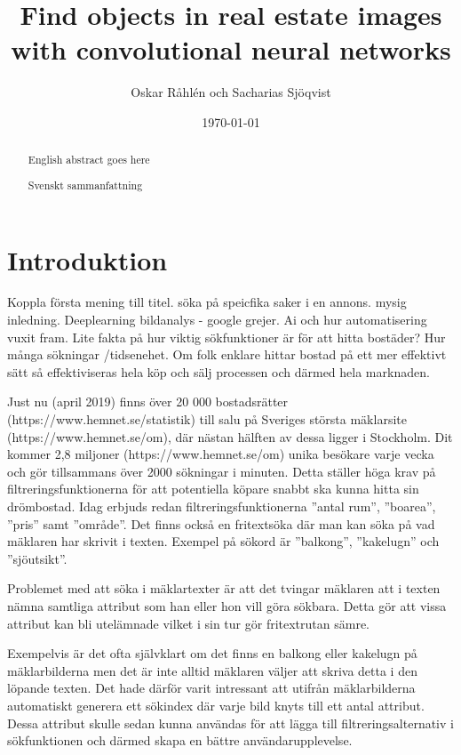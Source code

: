\documentclass[]{kththesis}
\title{Find objects in real estate images with convolutional neural networks}
\author{Oskar Råhlén och Sacharias Sjöqvist}
\date{\today}
\begin{document}
\frontmatter
\titlepage

\begin{abstract}
    English abstract goes here
\end{abstract}

\begin{otherlanguage}{swedish}
  \begin{abstract}
    Svenskt sammanfattning
  \end{abstract}
\end{otherlanguage}
  
\tableofcontents

\mainmatter

\chapter{Introduktion}
Koppla första mening till titel. söka på speicfika saker i en annons. mysig inledning. Deeplearning bildanalys - google grejer. Ai och hur automatisering vuxit fram. Lite fakta på hur viktig sökfunktioner är för att hitta bostäder? Hur många sökningar /tidsenehet. Om folk enklare hittar bostad på ett mer effektivt sätt så effektiviseras hela köp och sälj processen och därmed hela marknaden.

Just nu (april 2019) finns över 20 000 bostadsrätter (https://www.hemnet.se/statistik) till salu på Sveriges största mäklarsite (https://www.hemnet.se/om), där nästan hälften av dessa ligger i Stockholm. 
Dit kommer 2,8 miljoner (https://www.hemnet.se/om) unika besökare varje vecka och gör tillsammans över 2000 sökningar i minuten.
Detta ställer höga krav på filtreringsfunktionerna för att potentiella köpare snabbt ska kunna hitta sin drömbostad.
Idag erbjuds redan filtreringsfunktionerna ”antal rum”, ”boarea”, ”pris” samt ”område”. 
Det finns också en fritextsöka där man kan söka på vad mäklaren har skrivit i texten.
Exempel på sökord är ”balkong”, ”kakelugn” och ”sjöutsikt”. 

Problemet med att söka i mäklartexter är att det tvingar mäklaren att i texten nämna samtliga attribut som han eller hon vill göra sökbara. 
Detta gör att vissa attribut kan bli utelämnade vilket i sin tur gör fritextrutan sämre.

Exempelvis är det ofta självklart om det finns en balkong eller kakelugn på mäklarbilderna men det är inte alltid mäklaren väljer att skriva detta i den löpande texten.
Det hade därför varit intressant att utifrån mäklarbilderna automatiskt generera ett sökindex där varje bild knyts till ett antal attribut.
Dessa attribut skulle sedan kunna användas för att lägga till filtreringsalternativ i sökfunktionen och därmed skapa en bättre användarupplevelse.
\end{document}
